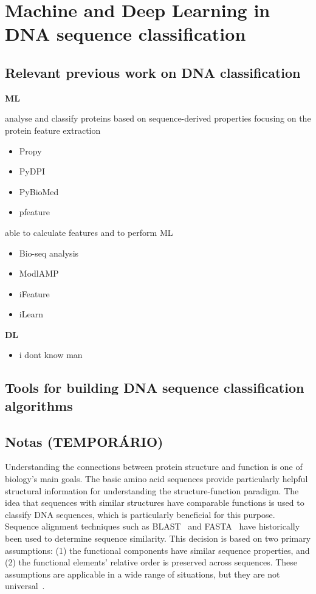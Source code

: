 \chapter{Machine and Deep Learning in DNA sequence classification} \label{sec:ml_dl_dna}

\section{Relevant previous work on DNA classification}

\textbf{ML}

analyse and classify proteins based on sequence-derived properties focusing on the protein feature extraction
\begin{itemize}
    \item Propy
    \item PyDPI
    \item PyBioMed
    \item pfeature
\end{itemize}

able to calculate features and to perform ML
\begin{itemize}
    \item Bio-seq analysis
    \item ModlAMP
    \item iFeature
    \item iLearn
\end{itemize}

\textbf{DL}

\begin{itemize}
    \item i dont know man 
\end{itemize}


\section{Tools for building DNA sequence classification algorithms}

\section{Notas (TEMPORÁRIO)}

Understanding the connections between protein structure and function is one of biology's main goals. The basic amino acid sequences provide particularly helpful structural information for understanding the structure-function paradigm. The idea that sequences with similar structures have comparable functions is used to classify DNA sequences, which is particularly beneficial for this purpose. Sequence alignment techniques such as BLAST~\cite{Altschul1990BasicTool} and FASTA~\cite{Pearson1988ImprovedComparison} have historically been used to determine sequence similarity. This decision is based on two primary assumptions: (1) the functional components have similar sequence properties, and (2) the functional elements' relative order is preserved across sequences. These assumptions are applicable in a wide range of situations, but they are not universal~\cite{LoBosco2017DeepClassification}.

